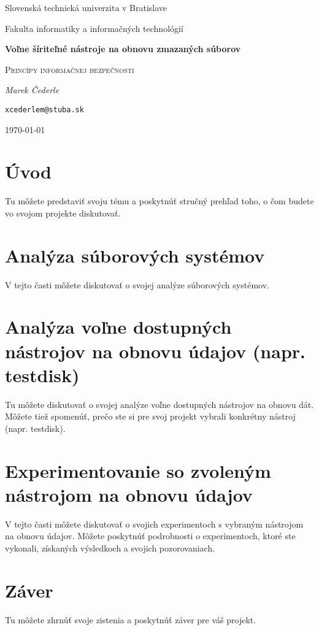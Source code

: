 \documentclass[12pt,oneside,slovak,a4paper]{article}
\begin{document}

\begin{titlepage}
	\centering
    {\Large Slovenská technická univerzita v Bratislave\par}
    {\Large Fakulta informatiky a informačných technológií\par}
	\vspace{7cm}
	{\huge\bfseries Voľne šíriteľné nástroje na obnovu zmazaných súborov\par}
	\vspace{0.5cm}
    {\Large \textsc{Princípy informačnej bezpečnosti}\par}
    \vspace{1cm}
	{\Large\itshape Marek Čederle\par}
    {\small\texttt{xcederlem@stuba.sk}\par}
	\vfill

	{\large \today\par}
\end{titlepage}


\tableofcontents
\vspace*{\fill}

\section{Úvod}
Tu môžete predstaviť\cite{TEST} svoju tému a poskytnúť stručný prehľad toho, o čom budete vo svojom projekte diskutovať.

\section{Analýza súborových systémov}
V tejto časti môžete diskutovať o svojej analýze súborových systémov.

\section{Analýza voľne dostupných nástrojov na obnovu údajov (napr. testdisk)}
Tu môžete diskutovať o svojej analýze voľne dostupných nástrojov na obnovu dát. Môžete tiež spomenúť, prečo ste si pre svoj projekt vybrali konkrétny nástroj (napr. testdisk).

\section{Experimentovanie so zvoleným nástrojom na obnovu údajov}
V tejto časti môžete diskutovať o svojich experimentoch s vybraným nástrojom na obnovu údajov. Môžete poskytnúť podrobnosti o experimentoch, ktoré ste vykonali, získaných výsledkoch a svojich pozorovaniach.

\section{Záver}
Tu môžete zhrnúť svoje zistenia a poskytnúť záver pre váš projekt.




\end{document}
